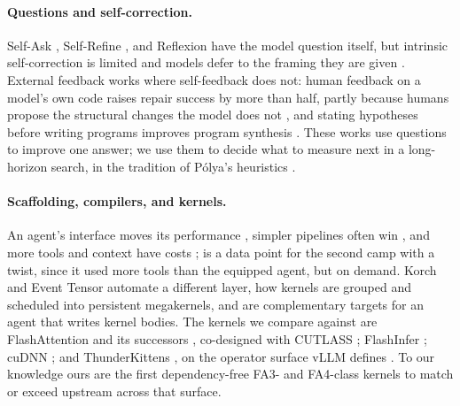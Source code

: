 \paragraph{Questions and self-correction.} Self-Ask \cite{press2023selfask}, Self-Refine
\cite{madaan2023selfrefine}, and Reflexion \cite{shinn2023reflexion} have the model question itself,
but intrinsic self-correction is limited \cite{huang2024cannotselfcorrect} and models defer to the
framing they are given \cite{sharma2024sycophancy}. External feedback works where self-feedback does
not: human feedback on a model's own code raises repair success by more than half, partly because
humans propose the structural changes the model does not \cite{olausson2024selfrepair}, and stating
hypotheses before writing programs improves program synthesis \cite{wang2024hypothesissearch}. These
works use questions to improve one answer; we use them to decide what to measure next in a
long-horizon search, in the tradition of P\'olya's heuristics \cite{polya1945howtosolveit}.

\paragraph{Scaffolding, compilers, and kernels.} An agent's interface moves its performance
\cite{yang2024sweagent}, simpler pipelines often win \cite{xia2024agentless,anthropic2024effectiveagents},
and more tools and context have costs \cite{langchain2025toolload,liu2024lost}; \sys is a data point
for the second camp with a twist, since it used more tools than the equipped agent, but on demand. Korch \cite{hu2024korch}
and Event Tensor \cite{jin2026eventtensor} automate a different layer, how kernels are grouped and
scheduled into persistent megakernels, and are complementary targets for an agent that writes
kernel bodies. The kernels we compare against are FlashAttention and its successors
\cite{dao2022flashattention,dao2024flashattention2,shah2024flashattention3,zadouri2026flashattention4},
co-designed with CUTLASS \cite{nvidia2023cutlass}; FlashInfer \cite{ye2025flashinfer}; cuDNN
\cite{nvidia2025cudnn}; and ThunderKittens \cite{spector2025thunderkittens}, on the operator surface
vLLM defines \cite{kwon2023vllm}. To our knowledge ours are the first dependency-free FA3- and
FA4-class kernels to match or exceed upstream across that surface.
